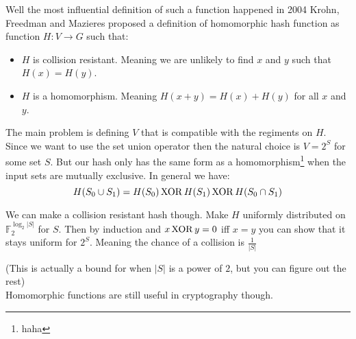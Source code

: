 Well the most influential definition of such a function happened in 2004 Krohn, Freedman and Mazieres proposed a definition of homomorphic hash function as function $H: V\rightarrow G$ such that:
\begin{itemize}
\item $H$ is collision resistant. Meaning we are unlikely to find $x$ and $y$ such that $H(x) = H(y)$.
\item $H$ is a homomorphism. Meaning $H(x+y) = H(x)+H(y)$ for all $x$ and $y$.
\end{itemize}

The main problem is defining $V$ that is compatible with the regiments on $H$.
Since we want to use the set union operator then the natural choice is $V = 2^S$ for some set $S$.
But our hash only has the same form as a homomorphism\footnote{haha} when the input sets are mutually exclusive.
In general we have:
\[H(S_0 \cup S_1) = H(S_0)\operatorname{XOR} H(S_1) \operatorname{XOR} H(S_0 \cap S_1)\]

We can make a collision resistant hash though.
Make $H$ uniformly distributed on $\mathbb{F}_2^{\log_2|S|}$ for $S$.
Then by induction and $x \operatorname{XOR} y = 0$ iff $x=y$ you can show that it stays uniform for $2^S$.
Meaning the chance of a collision is $\frac{1}{|S|}$

(This is actually a bound for when $|S|$ is a power of $2$, but you can figure out the rest)
\\

Homomorphic functions are still useful in cryptography though.
